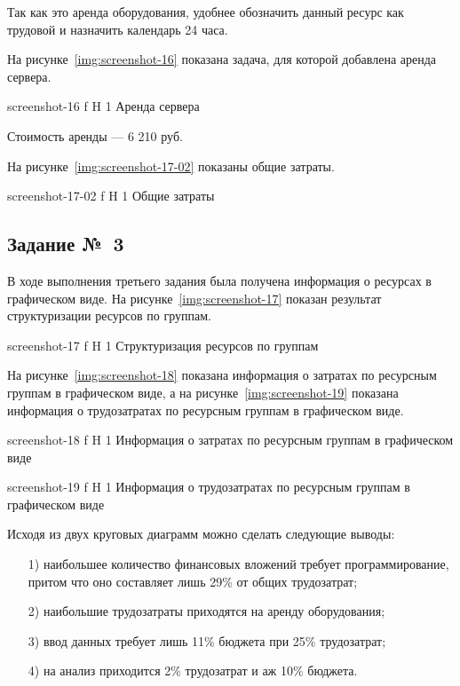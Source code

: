 \documentclass{bmstu}
\begin{document}
Так как это аренда оборудования, удобнее обозначить данный ресурс как трудовой и назначить календарь 24 часа.
    
На рисунке~\ref{img:screenshot-16} показана задача, для которой добавлена аренда сервера.
    
    {screenshot-16}
    {f}
    {H}
    {1\textwidth}
    {Аренда сервера}
    
Стоимость аренды --- 6 210 руб.

На рисунке~\ref{img:screenshot-17-02} показаны общие затраты.
    
    {screenshot-17-02}
    {f}
    {H}
    {1\textwidth}
    {Общие затраты}

\subsection{Задание №~3}

В ходе выполнения третьего задания была получена информация о ресурсах в графическом виде. 
На рисунке~\ref{img:screenshot-17} показан результат структуризации ресурсов по группам.
    
    {screenshot-17}
    {f}
    {H}
    {1\textwidth}
    {Структуризация ресурсов по группам}
    
На рисунке~\ref{img:screenshot-18} показана информация о затратах по ресурсным группам в графическом виде, а на рисунке~\ref{img:screenshot-19} показана информация о трудозатратах по ресурсным группам в графическом виде.

    {screenshot-18}
    {f}
    {H}
    {1\textwidth}
    {Информация о затратах по ресурсным группам в графическом виде}

    {screenshot-19}
    {f}
    {H}
    {1\textwidth}
    {Информация о трудозатратах по ресурсным группам в графическом виде}
    
Исходя из двух круговых диаграмм можно сделать следующие выводы:
\begin{enumerate}
\item[1)] наибольшее количество финансовых вложений требует программирование, притом что оно составляет лишь 29\% от общих трудозатрат;
\item[2)] наибольшие трудозатраты приходятся на аренду оборудования;
\item[3)] ввод данных требует лишь 11\% бюджета при 25\% трудозатрат;
\item[4)] на анализ приходится 2\% трудозатрат и аж 10\% бюджета.
\end{enumerate}
\end{document}
